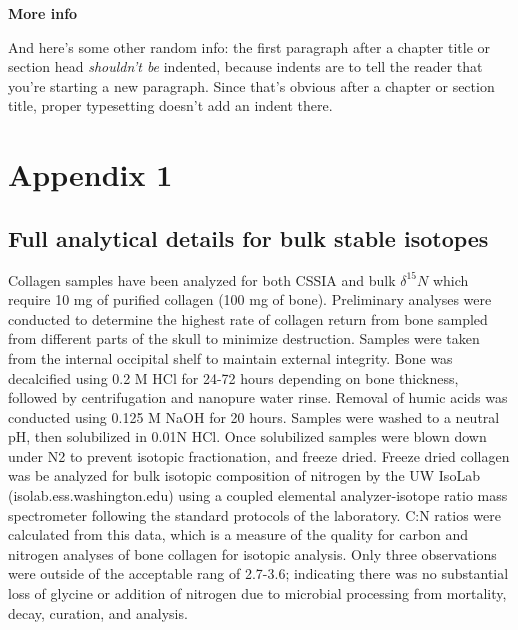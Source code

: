 \documentclass [11pt, proquest] {uwthesis}[2015/03/03]
\begin{document}
\textbf{More info}

And here's some other random info: the first paragraph after a chapter title or section head \emph{shouldn't be} indented, because indents are to tell the reader that you're starting a new paragraph. Since that's obvious after a chapter or section title, proper typesetting doesn't add an indent there.

\appendix

\hypertarget{appendix-1}{%
\chapter{Appendix 1}\label{appendix-1}}

\hypertarget{full-analytical-details-for-bulk-stable-isotopes}{%
\section{Full analytical details for bulk stable isotopes}\label{full-analytical-details-for-bulk-stable-isotopes}}

Collagen samples have been analyzed for both CSSIA and bulk \(\delta^{15}N\) which require 10 mg of purified collagen (100 mg of bone). Preliminary analyses were conducted to determine the highest rate of collagen return from bone sampled from different parts of the skull to minimize destruction. Samples were taken from the internal occipital shelf to maintain external integrity. Bone was decalcified using 0.2 M HCl for 24-72 hours depending on bone thickness, followed by centrifugation and nanopure water rinse. Removal of humic acids was conducted using 0.125 M NaOH for 20 hours. Samples were washed to a neutral pH, then solubilized in 0.01N HCl. Once solubilized samples were blown down under N2 to prevent isotopic fractionation, and freeze dried. Freeze dried collagen was be analyzed for bulk isotopic composition of nitrogen by the UW IsoLab (isolab.ess.washington.edu) using a coupled elemental analyzer-isotope ratio mass spectrometer following the standard protocols of the laboratory. C:N ratios were calculated from this data, which is a measure of the quality for carbon and nitrogen analyses of bone collagen for isotopic analysis. Only three observations were outside of the acceptable rang of 2.7-3.6; indicating there was no substantial loss of glycine or addition of nitrogen due to microbial processing from mortality, decay, curation, and analysis.
\end{document}
